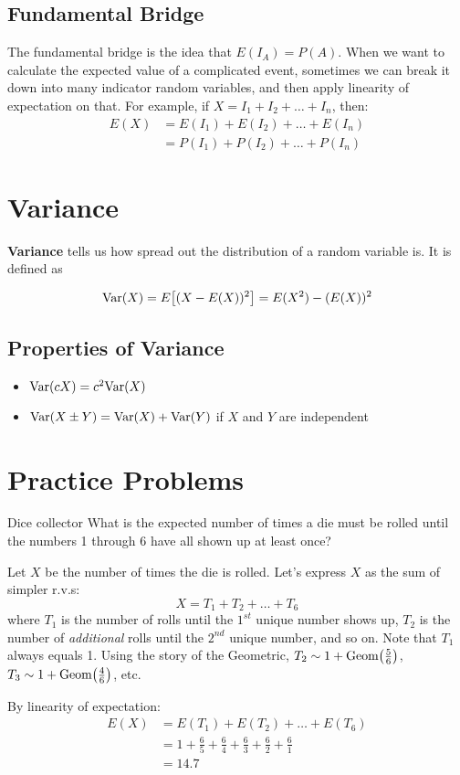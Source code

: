 \documentclass[11pt]{article}
\begin{document}
\begin{notes}
\subsection*{Fundamental Bridge} 
The fundamental bridge is the idea that $E(I_A) = P(A)$. When we want to calculate the expected value of a complicated event, sometimes we can break it down into many indicator random variables, and then apply linearity of expectation on that. For example, if $X = I_1 + I_2 + \ldots + I_n$, then: 
\begin{align*}
E(X) &= E(I_1) + E(I_2) + \ldots + E(I_n) \\ 
&= P(I_1) + P(I_2) + \ldots + P(I_n) 
\end{align*}

\section*{Variance}
\textbf{Variance} tells us how spread out the distribution of a random variable is. It is defined as

$$\var(X) = E\brack{(X - E(X))^2} = E(X^2) - (E(X))^2$$

\subsection*{Properties of Variance}
\begin{itemize}
\item $\textrm{Var}(cX) = c^2 \textrm{Var}(X)$
\item $\textrm{Var}(X \pm Y) = \textrm{Var}(X) + \textrm{Var}(Y)$ if $X$ and $Y$ are independent
\end{itemize}

\end{notes}


\newpage
\section*{Practice Problems}

\begin{exercise}{Dice collector}
What is the expected number of times a die must be rolled until the numbers 1 through 6 have all shown up at least once?
\end{exercise}

\begin{solution}{2}
Let $X$ be the number of times the die is rolled. Let's express $X$ as the sum of simpler r.v.s:
$$X = T_1 + T_2 + \ldots + T_6$$
where $T_1$ is the number of rolls until the $1^{st}$ unique number shows up, $T_2$ is the number of \textit{additional} rolls until the $2^{nd}$ unique number, and so on. Note that $T_1$ always equals 1. Using the story of the Geometric, $T_2 \sim 1 + \Geom\paren{\frac{5}{6}}$, $T_3 \sim 1 + \Geom\paren{\frac{4}{6}}$, etc. 

By linearity of expectation: 
\begin{align*}
E(X) &= E(T_1) + E(T_2) + \ldots + E(T_6) \\
&= 1 + \frac{6}{5} + \frac{6}{4} + \frac{6}{3} + \frac{6}{2} + \frac{6}{1} \\
&= \boxed{14.7}
\end{align*}
\end{solution}
\end{document}
